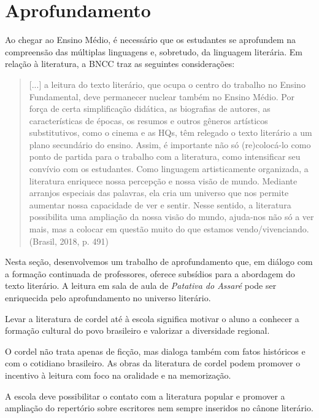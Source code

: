 \documentclass[12pt]{extarticle}
\begin{document}

\section{Aprofundamento}

Ao chegar ao Ensino Médio, é necessário que os estudantes se aprofundem
na compreensão das múltiplas linguagens e, sobretudo, da linguagem
literária. Em relação à literatura, a BNCC traz as seguintes
considerações:

\begin{quote}
{[}...{]} a leitura do texto literário, que ocupa o centro do trabalho
no Ensino Fundamental, deve permanecer nuclear também no Ensino Médio.
Por força de certa simplificação didática, as biografias de autores, as
características de épocas, os resumos e outros gêneros artísticos
substitutivos, como o cinema e as HQs, têm relegado o texto literário a
um plano secundário do ensino. Assim, é importante não só (re)colocá-lo
como ponto de partida para o trabalho com a literatura, como
intensificar seu convívio com os estudantes. Como linguagem
artisticamente organizada, a literatura enriquece nossa percepção e
nossa visão de mundo. Mediante arranjos especiais das palavras, ela cria
um universo que nos permite aumentar nossa capacidade de ver e sentir.
Nesse sentido, a literatura possibilita uma ampliação da nossa visão do
mundo, ajuda-nos não só a ver mais, mas a colocar em questão muito do
que estamos vendo/vivenciando. (Brasil, 2018, p. 491)
\end{quote}

Nesta seção, desenvolvemos um trabalho de aprofundamento que, em diálogo
com a formação continuada de professores, oferece subsídios para a
abordagem do texto literário. A leitura em sala de aula de
\emph{Patativa do Assaré} pode ser enriquecida pelo aprofundamento no
universo literário.

Levar a literatura de cordel até à escola significa motivar o aluno a
conhecer a formação cultural do povo brasileiro e valorizar a
diversidade regional.

O cordel não trata apenas de ficção, mas dialoga também com fatos
históricos e com o cotidiano brasileiro. As obras da literatura de
cordel podem promover o incentivo à leitura com foco na oralidade e na
memorização.

A escola deve possibilitar o contato com a literatura popular e promover
a ampliação do repertório sobre escritores nem sempre inseridos no
cânone literário.
\end{document}
